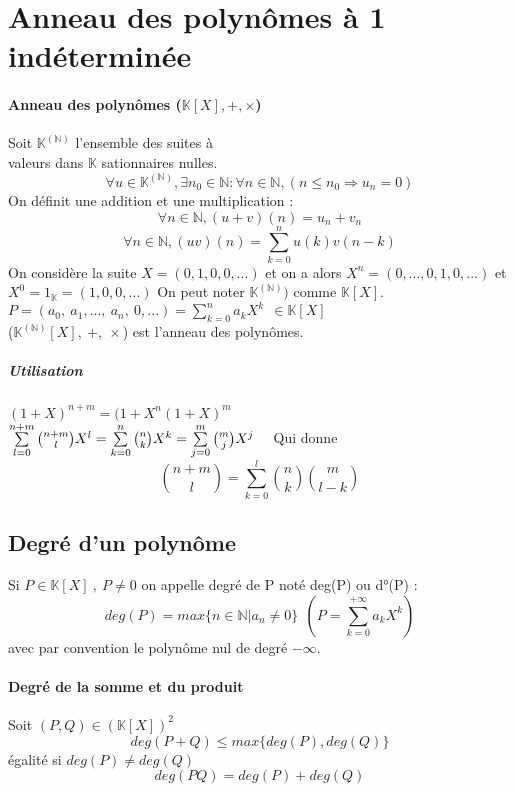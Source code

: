 

\minitoc
	\section{Anneau des polynômes à 1 indéterminée}
		\paragraph{Anneau des polynômes ($\mathbb{K} [X], +, \times$)}
			Soit $\mathbb{K}^{(\mathbb{N} )}$ l'ensemble des suites à \\ valeurs dans 
			$\mathbb{K}$ sationnaires nulles.
			\[\forall u\in\mathbb{K}^{(\mathbb{N} )} , \exists n_{0} \in \mathbb{N} : 
			\forall n\in\mathbb{N} , (n\leq n_{0} \Rightarrow u_{n}=0)\]
			On définit une addition et une multiplication :
			\[ \forall n\in\mathbb{N} , (u+v)(n) = u_{n}+v_{n} \]
			\[\forall n\in\mathbb{N} , (uv)(n) = \sum\limits_{k=0}^{n} u(k)v(n-k) \]
			On considère la suite $X=(0,1,0,0,...)$ et on a alors $X^{n} =(0,...,0,1,0,...)$
			et $X^{0} = 1_{\mathbb{K}} =(1,0,0,...)$ \hspace*{20pt}
			On peut noter $\mathbb{K}^{(\mathbb{N} )})$ comme $\mathbb{K} [X]$.\\
			$P=(a_{0} ,~a_{1} ,...,~a_{n} ,~0,...) = \sum\limits_{k=0}^{n} a_{k} X^{k} 
			~~\in\mathbb{K} [X]$ \\
			($\mathbb{K}^{(\mathbb{N} )} [X] ,~+,~\times$) est l'anneau des polynômes.
			\subparagraph{Utilisation}
			 $(1+X)^{n+m} = (1+X^{n} (1+X)^{m} 
			 $\\
			 $\sum\limits_{l=0}^{n+m} \binom{n+m}{l} X^{l} = \sum\limits_{k=0}^{n} 
			 \binom{n}{k} X^{k} = \sum\limits_{j=0}^{m} \binom{m}{j} X^{j} \hspace*{10pt}$ 
			 Qui donne \hspace*{10pt} 
			 $$\binom{n+m}{l} = \sum\limits_{k=0}^{l} \binom{n}{k} \binom{m}{l-k} $$
		\subsection{Degré d'un polynôme}
			Si $P\in\mathbb{K} [X]~,~P\neq 0$ on appelle degré de P noté deg(P) ou d°(P) :
			\[ deg(P) = max\{ n\in\mathbb{N} \vert a_{n} \neq 0\} ~~
			(P=\sum\limits_{k=0}^{+\infty } a_{k} X^{k} )\]
			avec par convention le polynôme nul de degré $-\infty$.
			\paragraph{Degré de la somme et du produit}
			 Soit $(P,Q) \in (\mathbb{K} [X] )^{2}$\\
			 \[  deg (P+Q) \leq max\{ deg(P),deg(Q)\} \] égalité si $deg(P)\neq deg(Q)$\\
			 \[deg(PQ) = deg(P) + deg(Q)\]
